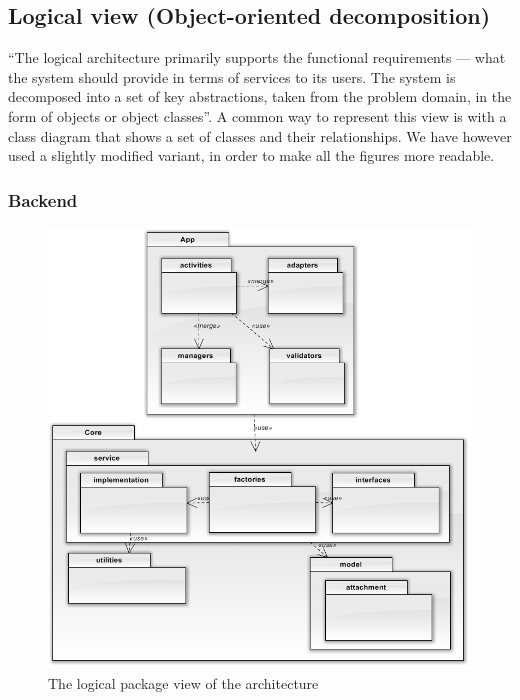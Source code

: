 \subsection{Logical view (Object-oriented decomposition)}\label{ch:logicalview}
``The logical architecture primarily supports the functional requirements --- what the system should provide in terms of services to its users. The system is decomposed into a set of key abstractions, taken from the problem domain, in the form of objects or object classes''\cite{bib:vm}. 
\newline
\newline
A common way to represent this view is with a class diagram that shows a set of classes and their relationships. We have however used a slightly modified variant, in order to make all the figures more readable.
\subsubsection{Backend}
\begin{figure}[H]
	\includegraphics[width=\textwidth]{packageDiagram.png}
	\caption{The logical package view of the architecture}
	\label{fig:logicalpackview}
\end{figure}

